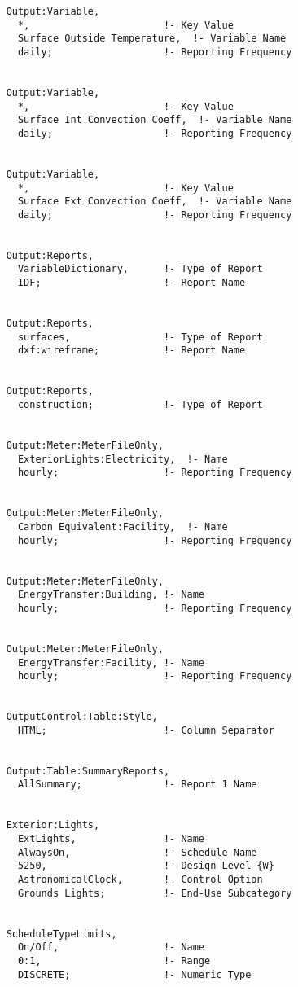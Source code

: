 \begin{lstlisting}
    Output:Variable,
      *,                       !- Key Value
      Surface Outside Temperature,  !- Variable Name
      daily;                   !- Reporting Frequency


    Output:Variable,
      *,                       !- Key Value
      Surface Int Convection Coeff,  !- Variable Name
      daily;                   !- Reporting Frequency


    Output:Variable,
      *,                       !- Key Value
      Surface Ext Convection Coeff,  !- Variable Name
      daily;                   !- Reporting Frequency


    Output:Reports,
      VariableDictionary,      !- Type of Report
      IDF;                     !- Report Name


    Output:Reports,
      surfaces,                !- Type of Report
      dxf:wireframe;           !- Report Name


    Output:Reports,
      construction;            !- Type of Report


    Output:Meter:MeterFileOnly,
      ExteriorLights:Electricity,  !- Name
      hourly;                  !- Reporting Frequency


    Output:Meter:MeterFileOnly,
      Carbon Equivalent:Facility,  !- Name
      hourly;                  !- Reporting Frequency


    Output:Meter:MeterFileOnly,
      EnergyTransfer:Building, !- Name
      hourly;                  !- Reporting Frequency


    Output:Meter:MeterFileOnly,
      EnergyTransfer:Facility, !- Name
      hourly;                  !- Reporting Frequency


    OutputControl:Table:Style,
      HTML;                    !- Column Separator


    Output:Table:SummaryReports,
      AllSummary;              !- Report 1 Name


    Exterior:Lights,
      ExtLights,               !- Name
      AlwaysOn,                !- Schedule Name
      5250,                    !- Design Level {W}
      AstronomicalClock,       !- Control Option
      Grounds Lights;          !- End-Use Subcategory


    ScheduleTypeLimits,
      On/Off,                  !- Name
      0:1,                     !- Range
      DISCRETE;                !- Numeric Type



\end{lstlisting}
